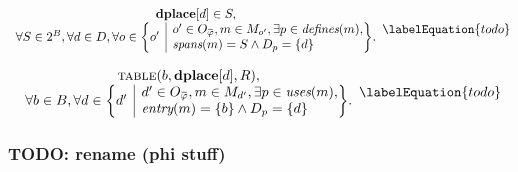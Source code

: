 

\begin{equation}
  \begin{array}{c}
    \mVar{dplace}[d] \in S, \\
    \forall S \in \mPowerset{\mBlockSet},
    \forall d \in \mDataSet,
    \forall o \in
      \mSetBuilder*{o'}%
                   {%
                     \begin{array}{@{}l@{}}
                       o' \in \mOpCompSet{\mPhi},
                       m \in \mMatchSet[o'],
                       \exists p \in \mDefines(m), \\
                       \mSpans(m) = S \mAnd \mDataSet[p] = \mSet{d}
                     \end{array}
                   } \!.
  \end{array}
  \labelEquation{todo}
\end{equation}



\begin{equation}
  \begin{array}{c}
    \mTable(b, \mVar{dplace}[d], \mDomMatrix), \\
    \forall b \in \mBlockSet,
    \forall d \in
      \mSetBuilder*{d'}%
                   {%
                     \begin{array}{@{}l@{}}
                       d' \in \mOpCompSet{\mPhi},
                       m \in \mMatchSet[d'],
                       \exists p \in \mUses(m), \\
                       \mEntry(m) = \mSet{b}
                       \mAnd \mDataSet[p] = \mSet{d}
                     \end{array}
                   } \!.
  \end{array}
  \labelEquation{todo}
\end{equation}

\subsubsection{TODO: rename (phi stuff)}

